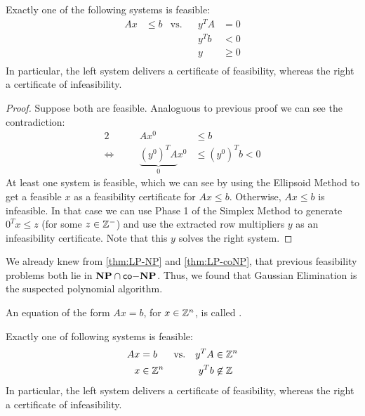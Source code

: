 \begin{theorem}
    \label{thm:farkas}
    Exactly one of the following systems is feasible:
    \begin{align*}
        Ax & \leq b & \text{vs.} &  & y^TA & =0     \\
           &        &            &  & y^Tb & <0     \\
           &        &            &  & y    & \geq 0 \\
    \end{align*}
    In particular, the left system delivers a certificate of feasibility, whereas the right a certificate of infeasibility.
\end{theorem}
\begin{proof}
    Suppose both are feasible. Analoguous to previous proof we can see the contradiction:
    \begin{alignat*}{2}
                              &  & Ax^0                        & \leq b            \\
        \Leftrightarrow \quad &  & \underbrace{(y^0)^TA}_0 x^0 & \leq (y^0)^Tb < 0
    \end{alignat*}
    At least one system is feasible, which we can see by using the Ellipsoid Method to get a feasible $x$ as a feasibility certificate for $Ax \leq b$. Otherwise, $Ax\leq b$ is infeasible.
    In that case we can use Phase 1 of the Simplex Method to generate $0^Tx \leq z$ (for some $z \in \mathbb{Z}^-$) and use the extracted row multipliers $y$ as an infeasibility certificate.
    Note that this $y$ solves the right system.
\end{proof}
\begin{conclusion}
    We already knew from \autoref{thm:LP-NP} and \autoref{thm:LP-coNP}, that previous feasibility problems both lie in $\mathbf{NP} \cap \mathsf{co-}\mathbf{NP}$.
    Thus, we found that Gaussian Elimination is the suspected polynomial algorithm.
\end{conclusion}
\begin{definition}
    An equation of the form $Ax=b$, for $x \in \mathbb{Z}^n$, is called .
\end{definition}
\begin{theorem}
    Exactly one of following systems is feasible:
    \begin{align*}
        Ax & = b             & \text{vs.} &  & y^TA & \in \mathbb{Z}^n    \\
        x  & \in \mathbb{Z}^n &            &  & y^Tb & \not \in \mathbb{Z} \\
    \end{align*}
    In particular, the left system delivers a certificate of feasibility, whereas the right a certificate of infeasibility.
\end{theorem}
